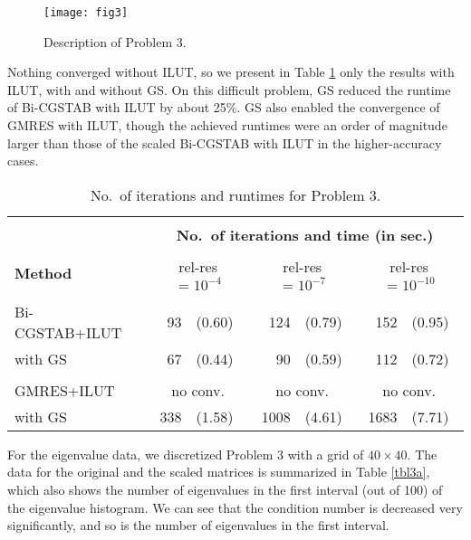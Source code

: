 \documentclass[12pt,a4paper]{article}
\newcounter{i}
\def\time{\!\times\!}
\def\noconv{\multicolumn{2}{|c|}{no conv.}}
\begin{document}
\begin{figure}[!h]
\centering
\texttt{[image: fig3]}
\caption{Description of Problem 3.}
\label{fig3}
\end{figure}

Nothing converged without ILUT, so we present in Table \ref{tbl3} 
only the results with ILUT, with and without GS.  On this difficult 
problem, GS reduced the runtime of Bi-CGSTAB with ILUT by about 25\%.  
GS also enabled the convergence of GMRES with ILUT, though the 
achieved runtimes were an order of magnitude larger than those 
of the scaled Bi-CGSTAB with ILUT in the higher-accuracy cases.

\begin{table}[!h]
\centering
\begin{tabular}{|l|rl|rl|rl|}
\hline
&\multicolumn{6}{|c|}{}\\[-12pt]
&\multicolumn{6}{|c|}{\bf No.\ of iterations and time (in sec.)}\\
\hline&&&&&&\\[-11pt]
{\bf Method} & \multicolumn{2}{|c|}{rel-res $=\!10^{-4}$}
& \multicolumn{2}{|c|}{rel-res $=\!10^{-7}$}
& \multicolumn{2}{|c|}{rel-res $=\!10^{-10}$} \\
\hline&&&&&&\\[-12pt]
Bi-CGSTAB+ILUT   & 93  & (0.60)  & 124 & (0.79)  & 152 & (0.95)  \\
with GS         & 67  & (0.44)  & 90  & (0.59)  & 112 & (0.72)  \\
\hline&&&&&&\\[-12pt]
GMRES+ILUT      & \noconv       & \noconv       & \noconv       \\
with GS         & 338 & (1.58)  & 1008 & (4.61) & 1683 & (7.71) \\
\hline
\end{tabular}
\caption{No.\ of iterations and runtimes for Problem 3.}
\label{tbl3}
\end{table}

For the eigenvalue data, we discretized Problem 3 with a grid of 
$40\time 40$.  The data for the original and the scaled matrices
is summarized in Table \ref{tbl3a}, which also shows the number 
of eigenvalues in the first interval (out of 100) of the eigenvalue 
histogram.  We can see that the condition number is decreased very 
significantly, and so is the number of eigenvalues in the first 
interval.
\end{document}
